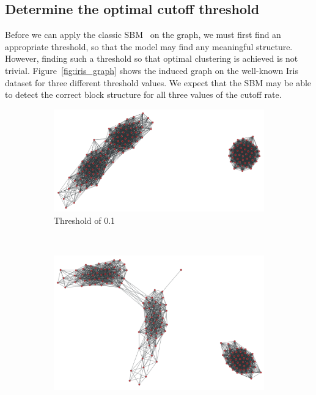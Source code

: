 \documentclass[conference]{IEEEtran}
\begin{document}
\subsection{Determine the optimal cutoff threshold}

Before we can apply the classic SBM~\cite{karrer2011stochastic} on the graph, we must first find an appropriate threshold, so that the model may find any meaningful structure. However, finding such a threshold so that optimal clustering is achieved is not trivial. Figure~\ref{fig:iris_graph} shows the induced graph on the well-known Iris dataset for three different threshold values. We expect that the SBM may be able to detect the correct block structure for all three values of the cutoff rate.

\begin{figure}[H]
    \centering
    \begin{subfigure}[c]{\columnwidth}
        \includegraphics[width=\columnwidth]{images/iris_threshold_01.png}
        \caption{Threshold of 0.1}
        \label{fig:iris_graph1}
    \end{subfigure}
    ~
    \begin{subfigure}[c]{\columnwidth}
        \includegraphics[width=\columnwidth]{images/iris_threshold_02.png}

\end{subfigure}
\end{figure}
\end{document}
